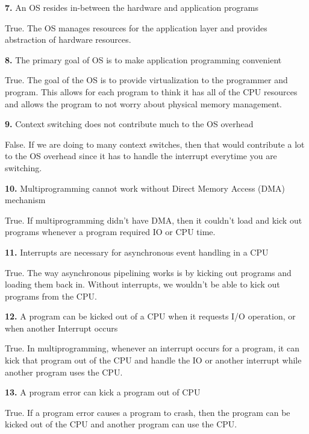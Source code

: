 \documentclass[12pt]{article}
\begin{document}
\bigskip

{\bf 7.} An OS resides in-between the hardware and application programs

True. The OS manages resources for the application layer and provides abstraction of hardware resources. 

\bigskip

{\bf 8.} The primary goal of OS is to make application programming convenient

True. The goal of the OS is to provide virtualization to the programmer and program. This allows for each program to think it has all of the CPU resources and allows the program to not worry about physical memory management. 

\bigskip

{\bf 9.} Context switching does not contribute much to the OS overhead

False. If we are doing to many context switches, then that would contribute a lot to the OS overhead since it has to handle the interrupt everytime you are switching. 

\bigskip

{\bf 10.} Multiprogramming cannot work without Direct Memory Access (DMA) mechanism

True. If multiprogramming didn't have DMA, then it couldn't load and kick out programs whenever a program required IO or CPU time. 

\bigskip

{\bf 11.} Interrupts are necessary for asynchronous event handling in a CPU

True. The way asynchronous pipelining works is by kicking out programs and loading them back in. Without interrupts, we wouldn't be able to kick out programs from the CPU. 

\bigskip

{\bf 12.} A program can be kicked out of a CPU when it requests I/O operation, or when another
Interrupt occurs

True. In multiprogramming, whenever an interrupt occurs for a program, it can kick that program out of the CPU and handle the IO or another interrupt while another program uses the CPU. 

\bigskip

{\bf 13.} A program error can kick a program out of CPU

True. If a program error causes a program to crash, then the program can be kicked out of the CPU and another program can use the CPU. 
\end{document}
